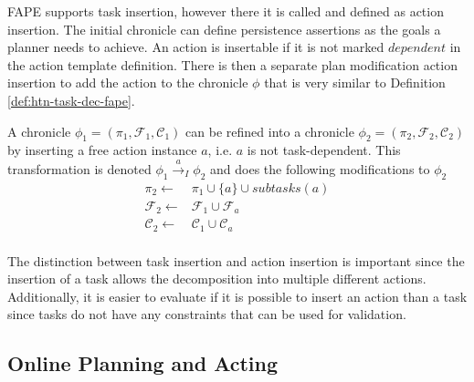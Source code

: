\ac{FAPE} supports task insertion, however there it is called and defined as action insertion.
The initial chronicle can define persistence assertions as the goals a planner needs to achieve.
An action is insertable if it is not marked $dependent$ in the action template definition.
There is then a separate plan modification action insertion to add the action to the chronicle $\phi$ that is very similar to Definition \ref{def:htn-task-dec-fape}.

\begin{definition}
  A chronicle $\phi_1 = (\pi_1,\mathcal{F}_1,\mathcal{C}_1)$ can be refined into a chronicle $\phi_2 = (\pi_2,\mathcal{F}_2,\mathcal{C}_2)$ by inserting a free action instance $a$, i.e. $a$ is not task-dependent. This transformation is denoted $\phi_1 \xrightarrow{a}_I \phi_2$ and does the following modifications to $\phi_2$
  \begin{align*}
    \pi_2 \leftarrow & \pi_1 \cup \{a\} \cup subtasks(a) \\
    \mathcal{F}_2 \leftarrow & \mathcal{F}_1 \cup \mathcal{F}_a \\
    \mathcal{C}_2 \leftarrow & \mathcal{C}_1 \cup \mathcal{C}_a \\
  \end{align*}
\end{definition}

The distinction between task insertion and action insertion is important since the insertion of a task allows the decomposition into multiple different actions.
Additionally, it is easier to evaluate if it is possible to insert an action than a task since tasks do not have any constraints that can be used for validation.




\subsection{Online Planning and Acting}\label{sec:acting}

